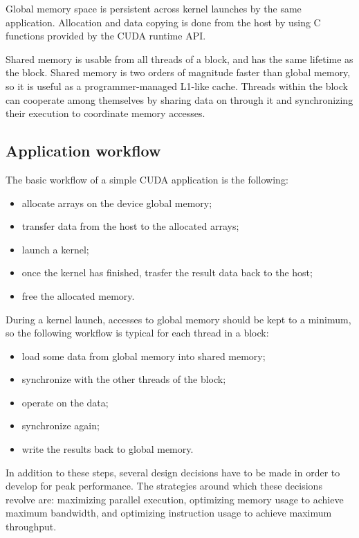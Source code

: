 Global memory space is persistent across kernel launches
by the same application.
Allocation and data copying is done from the host
by using C functions provided by the CUDA runtime API.

Shared memory is usable from all threads of a block,
and has the same lifetime as the block.
Shared memory is two orders of magnitude faster than global memory,
so it is useful as a programmer-managed L1-like cache.
Threads within the block can cooperate among themselves
by sharing data on through it and synchronizing their execution
to coordinate memory accesses.

\subsection{Application workflow}
\label{sub:app-workflow}

The basic workflow of a simple CUDA application is the following:
\begin{itemize}
  \item allocate arrays on the device global memory;
  \item transfer data from the host to the allocated arrays;
  \item launch a kernel;
  \item once the kernel has finished,
    trasfer the result data back to the host;
  \item free the allocated memory.
\end{itemize}

During a kernel launch,
accesses to global memory should be kept to a minimum,
so the following workflow is typical for each thread in a block:
\begin{itemize}
  \item load some data from global memory into shared memory;
  \item synchronize with the other threads of the block;
  \item operate on the data;
  \item synchronize again;
  \item write the results back to global memory.
\end{itemize}

In addition to these steps,
several design decisions have to be made
in order to develop for peak performance.
The strategies around which these decisions revolve are:
maximizing parallel execution,
optimizing memory usage to achieve maximum bandwidth, and
optimizing instruction usage to achieve maximum throughput.

